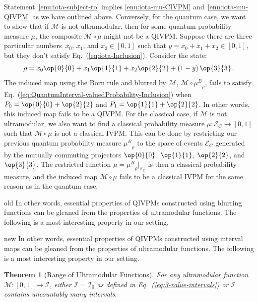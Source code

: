 \documentclass[english,reprint, aps, prl,superscriptaddress, showpacs,
showkeys, longbibliography, amsmath, amssymb, floatfix]{revtex4-1}
\theoremstyle{plain}
\newtheorem{thm}{Theorem}
\theoremstyle{definition}
\newcommand{\events}{\ensuremath{\mathcal{E}}}
\newcommand{\proj}[1]{\op{#1}{#1}}
\newcommand{\ultramodular}{\mathcal{M}}
\newcommand{\muB}{\ensuremath{\mu^{B}}}
\newcommand{\eventsC}{\ensuremath{\events_{C}}}
\newcommand{\says}[3]{\begin{framed}\begin{minipage}{0.9\linewidth}\color{#1}{#2 says: #3}\end{minipage}\end{framed}}
\newcommand{\andy}[1]{\says{blue}{Andy}{#1}}
\newenvironment{compare}{\begin{widetext}\end{widetext}}{\begin{widetext}\end{widetext}}
\newenvironment{oldText}[1]{\begin{compareText}{#1}{old}}{\end{compareText}\newpage}
\newenvironment{newText}[1]{\begin{compareText}{#1}{new}}{\end{compareText}}
\begin{document}
Statement~\ref{enu:iota-subject-to} implies \ref{enu:iota-mu-CIVPM}
and~\ref{enu:iota-mu-QIVPM} as we have outlined above. Conversely, for the quantum case, we want
to show that if $\ultramodular$ is not ultramodular, then for
some quantum probability measure $\mu$, the composite
$\ultramodular\circ\mu$ might not be a QIVPM. Suppose there are three
particular numbers~$x_{0}$, $x_{1}$, and $x_{2}\in\left[0,1\right]$
such that $y=x_{0}+x_{1}+x_{2}\in\left[0,1\right]$, but they don't
satisfy Eq.~(\ref{eq:iota-Inclusion}). Consider the state:
\[
\rho=x_{0}\proj{0}+x_{1}\proj{1}+x_{2}\proj{2}+\left(1-y\right)\proj{3}\,.
\]
The induced map using the Born rule and blurred by $\ultramodular$,
$\ultramodular\circ\muB_{\rho}$, fails to satisfy
Eq.~(\ref{eq:QuantumInterval-valuedProbability-Inclusion}) when
$P_{0}=\proj{0}+\proj{2}$ and $P_{1}=\proj{1}+\proj{2}$. In other
words, this induced map fails to be a QIVPM. For the classical case, if
$\ultramodular$ is not ultramodular, we also want to find a classical
probability measure $\mu:\eventsC\rightarrow\left[0,1\right]$ such
that $\ultramodular\circ\mu$ is not a classical IVPM. This can be
done by restricting our previous quantum probability measure
$\muB_{\rho}$ to the space of events  $\eventsC$  generated by the
mutually commuting projectors $\proj{0}$, $\proj{1}$, $\proj{2}$, and
$\proj{3}$.  The restricted function
$\mu=\muB_{\rho}|_{\eventsC}$ is then a classical probability
measure, and the induced map $\ultramodular\circ\mu$ fails to be
a classical IVPM for the same reason as in the quantum case.

\begin{compare}
\begin{oldText}{\andy}
In other words, essential properties of QIVPMs constructed using
{\color{blue}blurring function}s can be gleaned from the properties of
ultramodular functions. The following is a most interesting property
in our setting. 
\end{oldText}
\begin{newText}{\andy}
In other words, essential properties of QIVPMs constructed using
{\color{blue}interval map}s can be gleaned from the properties of
ultramodular functions. The following is a most interesting property
in our setting. 
\end{newText}
\end{compare}

\begin{thm}[Range of Ultramodular Functions]\label{thm:convex-uncountable}For
any ultramodular function~$\ultramodular:\left[0,1\right]\rightarrow\mathscr{I}$,
either $\mathscr{I}=\mathscr{I}_{0}$ as defined in Eq.~(\ref{eq:3-value-intervals}) or
$\mathscr{I}$ contains uncountably many intervals.\end{thm}
\end{document}
